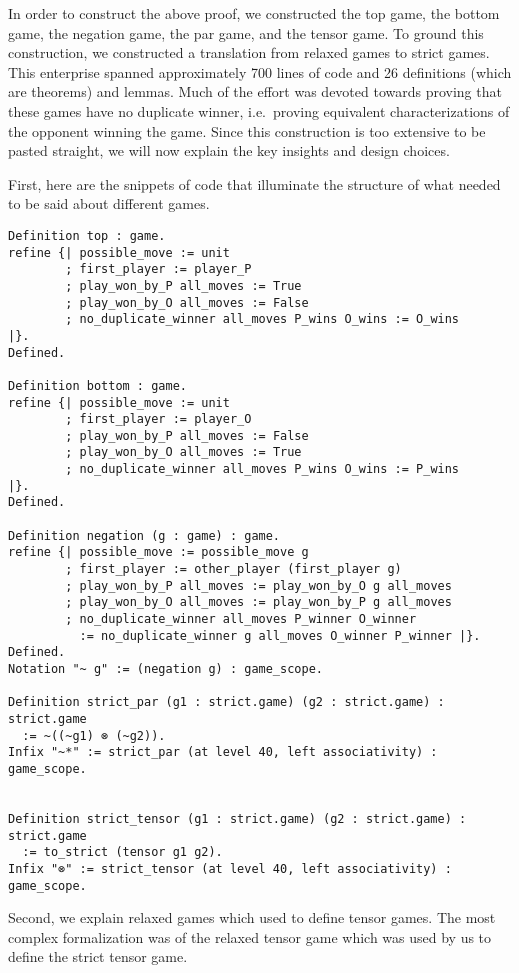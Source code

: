 \documentclass{article}
\theoremstyle{definition}
\begin{document}
\setcounter{thm}{\value{savethm}}

In order to construct the above proof, we constructed the top game, the bottom game, the negation game, the par game, and the tensor game. To ground this construction, we constructed a translation from relaxed games to strict games. This enterprise spanned approximately 700 lines of code and 26  definitions (which are theorems) and lemmas. Much of the effort was devoted towards proving that these games have no duplicate winner, i.e.\ proving equivalent characterizations of the opponent winning the game. Since this construction is too extensive to be pasted straight, we will now explain the key insights and design choices.

First, here are the snippets of code that illuminate the structure of what needed to be said about different games. 

\begin{verbatim}
Definition top : game.
refine {| possible_move := unit 
        ; first_player := player_P
        ; play_won_by_P all_moves := True
        ; play_won_by_O all_moves := False 
        ; no_duplicate_winner all_moves P_wins O_wins := O_wins    
|}.
Defined.    

Definition bottom : game.
refine {| possible_move := unit
        ; first_player := player_O
        ; play_won_by_P all_moves := False
        ; play_won_by_O all_moves := True
        ; no_duplicate_winner all_moves P_wins O_wins := P_wins
|}.
Defined.    
    
Definition negation (g : game) : game.
refine {| possible_move := possible_move g
        ; first_player := other_player (first_player g)
        ; play_won_by_P all_moves := play_won_by_O g all_moves 
        ; play_won_by_O all_moves := play_won_by_P g all_moves
        ; no_duplicate_winner all_moves P_winner O_winner 
          := no_duplicate_winner g all_moves O_winner P_winner |}.
Defined.
Notation "~ g" := (negation g) : game_scope.

Definition strict_par (g1 : strict.game) (g2 : strict.game) : strict.game 
  := ~((~g1) ⊗ (~g2)).
Infix "~*" := strict_par (at level 40, left associativity) : game_scope.


Definition strict_tensor (g1 : strict.game) (g2 : strict.game) : strict.game 
  := to_strict (tensor g1 g2).
Infix "⊗" := strict_tensor (at level 40, left associativity) : game_scope.

\end{verbatim}

Second, we  explain relaxed games which \textcite{Blass1992} used to define tensor games. The most complex formalization was of the relaxed tensor game which was used by us to define the strict tensor game. 
\end{document}
